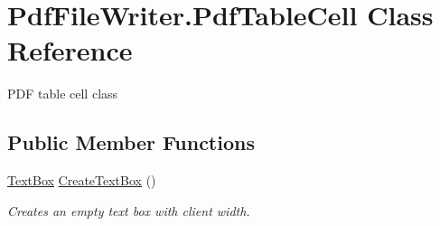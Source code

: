 \hypertarget{class_pdf_file_writer_1_1_pdf_table_cell}{}\section{Pdf\+File\+Writer.\+Pdf\+Table\+Cell Class Reference}
\label{class_pdf_file_writer_1_1_pdf_table_cell}


P\+DF table cell class  


\subsection*{Public Member Functions}
\begin{DoxyCompactItemize}
\item 
\hyperlink{class_pdf_file_writer_1_1_text_box}{Text\+Box} \hyperlink{class_pdf_file_writer_1_1_pdf_table_cell_a4166e5e4922434da9fe413384daa0ef8}{Create\+Text\+Box} ()
\begin{DoxyCompactList}\small\item\em Creates an empty text box with client width. \end{DoxyCompactList}\end{DoxyCompactItemize}
